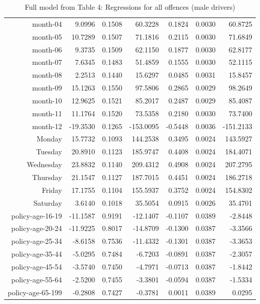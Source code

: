 \documentclass[10pt]{article}
\begin{document}
\begin{table}[ht]
\begin{tabular}{rrrrrrr}
  month-04 & 9.0996 & 0.1508 & 60.3228 & 0.1824 & 0.0030 & 60.8725 \\ 
  month-05 & 10.7289 & 0.1507 & 71.1816 & 0.2115 & 0.0030 & 71.6849 \\ 
  month-06 & 9.3735 & 0.1509 & 62.1150 & 0.1877 & 0.0030 & 62.8177 \\ 
  month-07 & 7.6345 & 0.1483 & 51.4859 & 0.1555 & 0.0030 & 52.1115 \\ 
  month-08 & 2.2513 & 0.1440 & 15.6297 & 0.0485 & 0.0031 & 15.8457 \\ 
  month-09 & 15.1263 & 0.1550 & 97.5806 & 0.2865 & 0.0029 & 98.2649 \\ 
  month-10 & 12.9625 & 0.1521 & 85.2017 & 0.2487 & 0.0029 & 85.4087 \\ 
  month-11 & 11.1764 & 0.1520 & 73.5358 & 0.2180 & 0.0030 & 73.7400 \\ 
  month-12 & -19.3530 & 0.1265 & -153.0095 & -0.5448 & 0.0036 & -151.2133 \\ 
  Monday & 15.7732 & 0.1093 & 144.2538 & 0.3495 & 0.0024 & 143.5927 \\ 
  Tuesday & 20.8910 & 0.1123 & 185.9747 & 0.4408 & 0.0024 & 184.4071 \\ 
  Wednesday & 23.8832 & 0.1140 & 209.4312 & 0.4908 & 0.0024 & 207.2795 \\ 
  Thursday & 21.1547 & 0.1127 & 187.7015 & 0.4451 & 0.0024 & 186.2718 \\ 
  Friday & 17.1755 & 0.1104 & 155.5937 & 0.3752 & 0.0024 & 154.8302 \\ 
  Saturday & 3.6140 & 0.1018 & 35.5054 & 0.0915 & 0.0026 & 35.4701 \\ 
  policy-age-16-19 & -11.1587 & 0.9191 & -12.1407 & -0.1107 & 0.0389 & -2.8448 \\ 
  policy-age-20-24 & -11.9225 & 0.8017 & -14.8709 & -0.1300 & 0.0387 & -3.3566 \\ 
  policy-age-25-34 & -8.6158 & 0.7536 & -11.4332 & -0.1301 & 0.0387 & -3.3653 \\ 
  policy-age-35-44 & -5.0295 & 0.7484 & -6.7203 & -0.0891 & 0.0387 & -2.3057 \\ 
  policy-age-45-54 & -3.5740 & 0.7450 & -4.7971 & -0.0713 & 0.0387 & -1.8442 \\ 
  policy-age-55-64 & -2.5200 & 0.7455 & -3.3801 & -0.0594 & 0.0387 & -1.5334 \\ 
  policy-age-65-199 & -0.2808 & 0.7427 & -0.3781 & 0.0011 & 0.0389 & 0.0295 \\ 
   \hline
\end{tabular}
\caption{Full model from Table 4: Regressions for all offences (male drivers)} 
\label{tab_4_all_pts_M}
\end{table}
\end{document}
